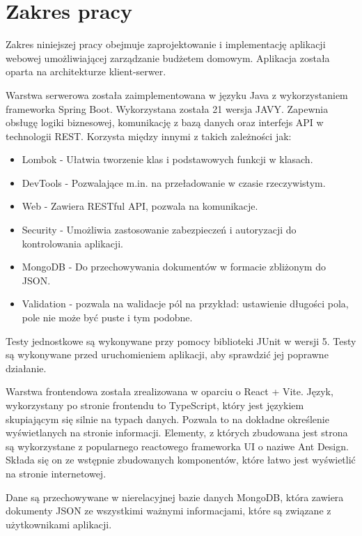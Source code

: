 \section*{Zakres pracy}
Zakres niniejszej pracy obejmuje zaprojektowanie i implementację aplikacji webowej umożliwiającej zarządzanie budżetem domowym. 
Aplikacja została oparta na architekturze klient-serwer. 

Warstwa serwerowa została zaimplementowana w języku Java z wykorzystaniem frameworka Spring Boot. Wykorzystana została 21 wersja JAVY. Zapewnia obsługę logiki biznesowej, komunikację z bazą danych oraz interfejs API w technologii REST.  Korzysta między innymi z takich zależności jak: 
\begin{itemize}
	\item Lombok - Ułatwia tworzenie klas i podstawowych funkcji w klasach.
	\item DevTools - Pozwalające m.in. na przeładowanie w czasie rzeczywistym.
	\item Web - Zawiera RESTful API, pozwala na komunikacje.
	\item Security - Umożliwia zastosowanie zabezpieczeń i autoryzacji do kontrolowania aplikacji.
	\item MongoDB - Do przechowywania dokumentów w formacie zbliżonym do JSON.
	\item Validation - pozwala na walidacje pól na przykład: ustawienie długości pola, pole nie może być puste i tym podobne.
\end{itemize}
Testy jednostkowe są wykonywane przy pomocy biblioteki JUnit w wersji 5. Testy są wykonywane przed uruchomieniem aplikacji, aby sprawdzić jej poprawne działanie. 

Warstwa frontendowa została zrealizowana w oparciu o React + Vite. Język, wykorzystany po stronie frontendu to TypeScript, który jest językiem skupiającym się silnie na typach danych. Pozwala to na dokładne określenie wyświetlanych na stronie informacji. Elementy, z których zbudowana jest strona są wykorzystane z popularnego reactowego frameworka UI o naziwe Ant Design. Składa się on ze wstępnie zbudowanych komponentów, które łatwo jest wyświetlić na stronie internetowej.

Dane są przechowywane w nierelacyjnej bazie danych MongoDB, która zawiera dokumenty JSON ze wszystkimi ważnymi informacjami, które są związane z użytkownikami aplikacji.


